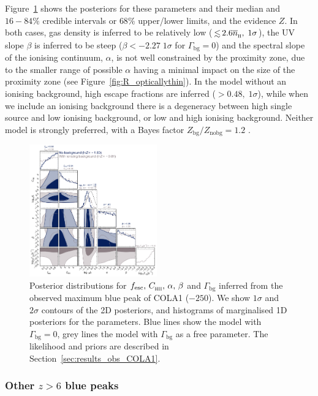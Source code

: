 \documentclass[fleqn,usenatbib]{mnras}
\begin{document}
Figure~\ref{fig:COLA1} shows the posteriors for these parameters and their median and $16-84\%$ credible intervals or $68\%$ upper/lower limits, and the evidence $Z$. In both cases, gas density is inferred to be relatively low ($\simlt2.6\nh, \; 1\sigma$), the UV slope $\beta$ is inferred to be steep ($\beta < -2.27 \; 1\sigma$ for $\Gamma_\mathrm{bg} = 0$) and the spectral slope of the ionising continuum, $\alpha$, is not well constrained by the proximity zone, due to the smaller range of possible $\alpha$ having a minimal impact on the size of the proximity zone (see Figure~\ref{fig:R_opticallythin}). In the model without an ionising background, high escape fractions are inferred ($>0.48, \; 1\sigma$), while when we include an ionising background there is a degeneracy between high single source \fesc and low ionising background, or low \fesc and high ionising background. Neither model is strongly preferred, with a Bayes factor $Z_\mathrm{bg}/Z_\mathrm{no bg} = 1.2$ \citep[e.g.,][]{Trotta2008}.

\begin{figure}
    \includegraphics[width=0.49\textwidth]{figs/fig7.pdf}
    \caption{Posterior distributions for $\fesc, \, \clump, \, \alpha, \, \beta$ and $\Gamma_\textrm{bg}$ inferred from the observed maximum blue \lya peak of COLA1 ($-250$\kms). We show $1\sigma$ and $2\sigma$ contours of the 2D posteriors, and histograms of marginalised 1D posteriors for the parameters. Blue lines show the model with $\Gamma_\mathrm{bg}=0$, grey lines the model with $\Gamma_\mathrm{bg}$ as a free parameter. The likelihood and priors are described in Section~\ref{sec:results_obs_COLA1}.}
    \label{fig:COLA1}
\end{figure}

\subsubsection{Other $z>6$ blue peaks}
\label{sec:results_obs_other}
\end{document}
